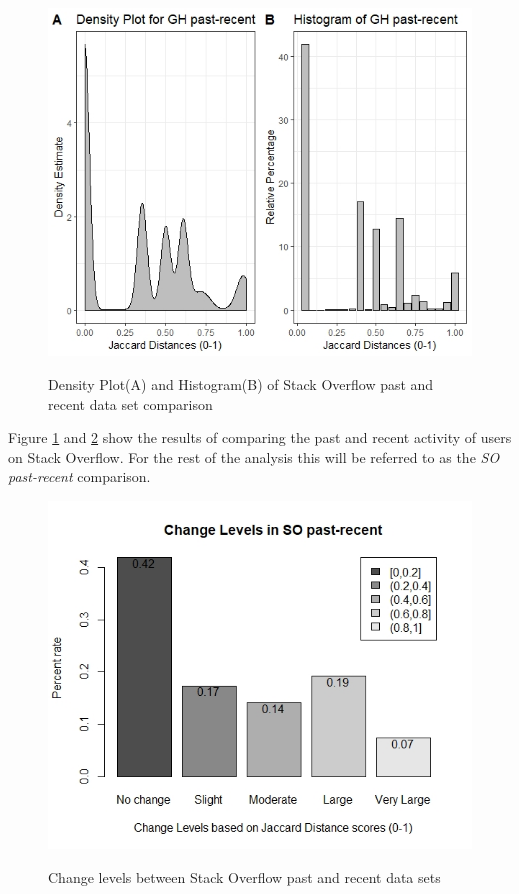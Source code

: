         \begin{figure}
          \centering
          \includegraphics[width=\textwidth]{figures/SO_past-recent.jpeg}\\
          \caption{Density Plot(A) and Histogram(B) of Stack Overflow past and recent data set comparison}
          \label{fig:SO_past_recent}
        \end{figure}
        
        Figure \ref{fig:SO_past_recent} and \ref{fig:change_SO_past_recent} show the results of comparing the past and recent activity of users on Stack Overflow. For the rest of the analysis this will be referred to as the \emph{SO past-recent} comparison. %
        
        \begin{figure}
          \centering
          \includegraphics[width=\textwidth]{figures/change_levels_SO_past-recent.jpeg}\\
          \caption{Change levels between Stack Overflow past and recent data sets}
          \label{fig:change_SO_past_recent}
        \end{figure}
        
